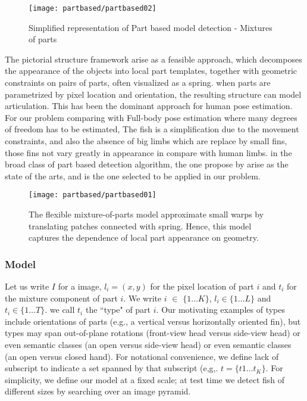 \begin{figure}[ht]
\centering
\texttt{[image: partbased/partbased02]}
\caption{Simplified representation of Part based model detection - Mixtures of parts}
\label{fig:partbesed02}
\end{figure}

The pictorial structure framework arise as a feasible approach, which decomposes the appearance
of the objects into local part templates, together with geometric constraints on pairs of parts, 
often visualized as a spring. when parts are parametrized by pixel location and orientation, 
the resulting structure can model articulation. This has been the dominant approach for human
pose estimation. For our problem comparing with Full-body pose estimation where many degrees 
of freedom has to be estimated, The fish is a simplification due to the movement constraints,
and also the absence of big limbs which are replace by small fins, those fins not vary 
greatly in appearance in compare with human limbs. in the broad class of part based 
detection algorithm, the one propose by \citet{Ramanan2012} arise as the state of 
the arts, and is the one selected to be applied in
our problem.



\begin{figure}[ht]
\centering
\texttt{[image: partbased/partbased01]}
\caption{The flexible mixture-of-parts model approximate small warps by translating patches connected with spring.
Hence, this model captures the dependence of local part appearance on geometry.}
\label{fig:partbesed01}
\end{figure}

\subsubsection{Model}
Let us write $I$ for a image, $l_i = (x,y)$ for the pixel location of part $i$ and $t_i$ 
for the mixture component of part $i$. We write $i$ $\in$  $\{1\dotsc K\}$, $l_i \in \{1\dotsc L\}$ 
and $t_i \in \{1\dotsc T\}$. we call $t_i$ the ``type" of part $i$.
Our motivating examples of types include orientations of parts 
(e.g., a vertical versus horizontally oriented fin), but types may span out-of-plane
rotations (front-view head versus side-view head) or even semantic classes 
(an open versus side-view head) or even semantic classes (an open versus closed hand). 
For notational convenience, we define lack of subscript to indicate a set spanned by that subscript
(e,g,. $t=\{t1\dotsc t_K\}$. For simplicity, we define our model at a fixed scale; 
at test time we detect fish of different sizes by searching over an image pyramid.

